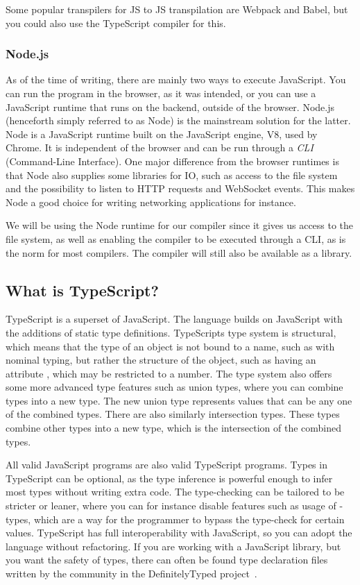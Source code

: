 Some popular transpilers for JS to JS transpilation are Webpack and Babel, but you could also use the TypeScript compiler for this.

\subsubsection{Node.js}\label{subsubsec:node}

As of the time of writing, there are mainly two ways to execute JavaScript.
You can run the program in the browser, as it was intended, or you can use a JavaScript runtime that runs on the backend, outside of the browser.
Node.js (henceforth simply referred to as Node) is the mainstream solution for the latter.
Node is a JavaScript runtime built on the JavaScript engine, V8, used by Chrome.
It is independent of the browser and can be run through a \textit{CLI} (Command-Line Interface).
One major difference from the browser runtimes is that Node also supplies some libraries for IO, such as access to the file system and the possibility to listen to HTTP requests and WebSocket events.
This makes Node a good choice for writing networking applications for instance.

We will be using the Node runtime for our compiler since it gives us access to the file system, as well as enabling the compiler to be executed through a CLI, as is the norm for most compilers.
The compiler will still also be available as a library.

\subsection{What is TypeScript?}\label{subsec:what-is-typescript}

TypeScript is a superset of JavaScript.
The language builds on JavaScript with the additions of static type definitions.
TypeScripts type system is structural, which means that the type of an object is not bound to a name, such as with nominal typing, but rather the structure of the object, such as having an attribute , which may be restricted to a number.
The type system also offers some more advanced type features such as union types, where you can combine types into a new type.
The new union type represents values that can be any one of the combined types.
There are also similarly intersection types.
These types combine other types into a new type, which is the intersection of the combined types.

All valid JavaScript programs are also valid TypeScript programs.
Types in TypeScript can be optional, as the type inference is powerful enough to infer most types without writing extra code.
The type-checking can be tailored to be stricter or leaner, where you can for instance disable features such as usage of -types, which are a way for the programmer to bypass the type-check for certain values.
TypeScript has full interoperability with JavaScript, so you can adopt the language without refactoring.
If you are working with a JavaScript library, but you want the safety of types, there can often be found type declaration files written by the community in the DefinitelyTyped project~\cite{tswebsite}.


